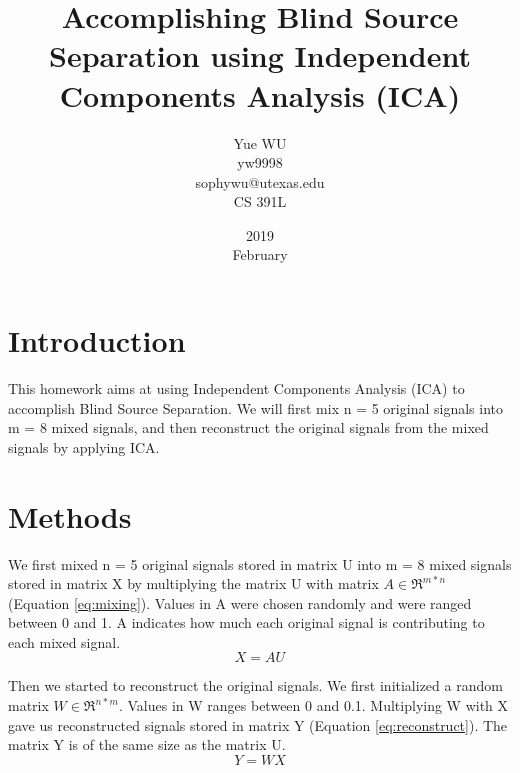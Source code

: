 \documentclass[UTF8,12pt]{article}
\title{Accomplishing Blind Source Separation using Independent Components Analysis (ICA)}
\date{2019\\ February}
\author{Yue WU\\ yw9998\\ sophywu@utexas.edu\\ CS 391L}
\begin{document}
	\maketitle
	\section{Introduction}
	This homework aims at using Independent Components Analysis (ICA) to accomplish Blind Source Separation. We will first mix n = 5 original signals into m = 8 mixed signals, and then reconstruct the original signals from the mixed signals by applying ICA.
	\section{Methods}
	We first mixed n = 5 original signals stored in matrix U into m = 8 mixed signals stored in matrix X by multiplying the matrix U with matrix $A\in \Re ^{m*n}$ (Equation \ref{eq:mixing}). Values in A were chosen randomly and were ranged between 0 and 1. A indicates how much each original signal is contributing to each mixed signal.
	\begin{equation}
	\label{eq:mixing}
	X = AU
	\end{equation}
	
	Then we started to reconstruct the original signals. We first initialized a random matrix $W\in \Re ^{n*m}$. Values in W ranges between 0 and 0.1. Multiplying W with X gave us reconstructed signals stored in matrix Y (Equation \ref{eq:reconstruct}). The matrix Y is of the same size as the matrix U.
	\begin{equation}
	\label{eq:reconstruct}
	Y = WX
	\end{equation}
	
\end{document}
